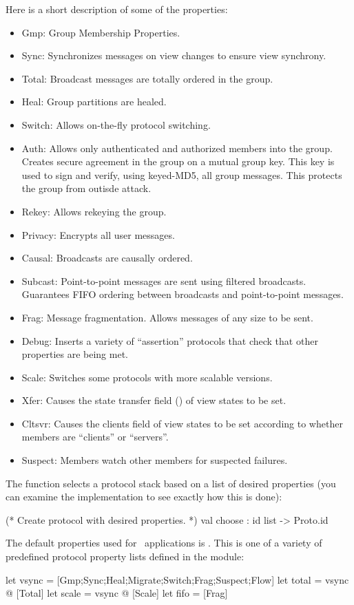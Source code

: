 Here is a short description of some of the properties:
\begin{itemize}
\item {Gmp:} Group Membership Properties.
\item {Sync:} Synchronizes messages on view changes to ensure view synchrony.
\item {Total:} Broadcast messages are totally ordered in the group.
\item {Heal:} Group partitions are healed.
\item {Switch:} Allows on-the-fly protocol switching.
\item {Auth:} Allows only authenticated and authorized members into
the group. Creates secure agreement in the group on a mutual group
key. This key is used to sign and verify, using keyed-MD5, all group
messages. This protects the group from outisde attack. 
\item {Rekey:} Allows rekeying the group.  
\item {Privacy:} Encrypts all user messages. 
\item {Causal:} Broadcasts are causally ordered.
\item {Subcast:} Point-to-point messages are sent using filtered broadcasts.
Guarantees FIFO ordering between broadcasts and point-to-point messages.
\item {Frag:} Message fragmentation.  Allows messages of any size to be sent.
\item {Debug:} Inserts a variety of ``assertion'' protocols that check that
other properties are being met.
\item {Scale:} Switches some protocols with more scalable versions.
\item {Xfer:} Causes the state transfer field () of view states to
be set.
\item {Cltsvr:} Causes the clients field of view states to be set according to
whether members are ``clients'' or ``servers''.
\item {Suspect:} Members watch other members for suspected failures.
\end{itemize}

The  function selects a protocol stack based on a list
of desired properties (you can examine the implementation to see exactly how
this is done):
\begin{codebox}
(* Create protocol with desired properties.
 *)
val choose : id list -> Proto.id
\end{codebox}

The default properties used for \ensemble\ applications is .
This is one of a variety of predefined protocol property lists defined in the
 module:
\begin{codebox}
let vsync = [Gmp;Sync;Heal;Migrate;Switch;Frag;Suspect;Flow]
let total = vsync @ [Total]
let scale = vsync @ [Scale]
let fifo = [Frag]
\end{codebox}
